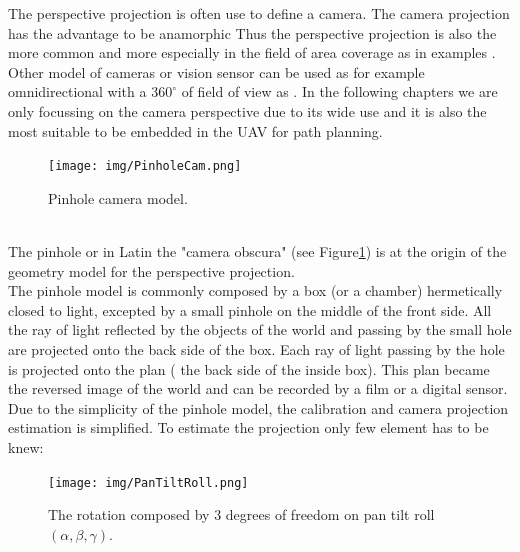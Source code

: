 The perspective projection is often use to define a camera. The camera projection has the advantage to be anamorphic 
Thus the perspective projection is also the more common and more especially in the field of area coverage as in examples \cite{101*topcuoglu2009,33*reddy2012,8*zhou2011,82*chrysostomou2012,22*zhao2008}. Other model of cameras or vision sensor can be used as for example omnidirectional with a $360^{\circ}$ of field of view as \citep{43*erdem2006,150*chakrabarty2002,174*zhang2016}. 
In the following chapters we are only focussing on the camera perspective due to its wide use and it is also the most suitable to be embedded in the UAV for path planning. 
\begin{figure}[t!]
\begin{center}
   \texttt{[image: img/PinholeCam.png]}
  \caption{Pinhole camera model.}\label{fig:cameraObscura}
  \endminipage\hfill
\end{center}
\end{figure} 
\\The pinhole or in Latin the "camera obscura" (see Figure\ref{fig:cameraObscura}) is at the origin of the geometry model for the perspective projection.\\
The pinhole model is commonly composed by a box (or  a chamber) hermetically closed to light, excepted by a small pinhole on the middle of the front side. All the ray of light reflected by the objects of the world and passing by the small hole are projected onto the back side of the box. Each ray of light passing by the hole is  projected onto the plan ( the back side of the inside box). This plan became the reversed image of the world and can be recorded by a film or a digital sensor. 
 Due to the simplicity of the pinhole model, the calibration and camera projection estimation is simplified. To estimate the projection only few element has to be knew:
  
 
\begin{figure}[t!]
\begin{center}
   \texttt{[image: img/PanTiltRoll.png]}
  \caption{The rotation composed by 3 degrees of freedom on pan tilt roll$(\alpha,\beta,\gamma)$.}\label{fig:PanTiltRoll}
  \endminipage\hfill
  \end{center}
\end{figure}

